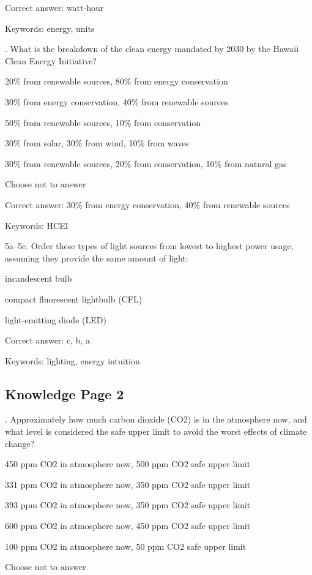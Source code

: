 Correct answer: watt-hour

Keywords: energy, units

\vspace{5 mm}
. What is the breakdown of the clean energy mandated by 2030 by the Hawaii Clean Energy Initiative?

\begin{answer}
	\item 20\% from renewable sources, 80\% from energy conservation
	\item 30\% from energy conservation, 40\% from renewable sources
	\item 50\% from renewable sources, 10\% from conservation
	\item 30\% from solar, 30\% from wind, 10\% from waves
	\item 30\% from renewable sources, 20\% from conservation, 10\% from natural gas
	\item Choose not to answer
\end{answer}

Correct answer: 30\% from energy conservation, 40\% from renewable sources

Keywords: HCEI

\vspace{5 mm}
\noindent
5a--5c. Order these types of light sources from lowest to highest power usage, assuming they provide the same amount of light:

\begin{answer}
	\item incandescent bulb
	\item compact fluorescent lightbulb (CFL)
	\item light-emitting diode (LED)
\end{answer}

Correct answer: c, b, a

Keywords: lighting, energy intuition


\subsection{Knowledge Page 2}

. Approximately how much carbon dioxide (CO2) is in the atmosphere now, and what level is considered the safe upper limit to avoid the worst effects of climate change?

\begin{answer}
	\item 450 ppm CO2 in atmosphere now, 500 ppm CO2 safe upper limit
	\item 331 ppm CO2 in atmosphere now, 350 ppm CO2 safe upper limit
	\item 393 ppm CO2 in atmosphere now, 350 ppm CO2 safe upper limit
	\item 600 ppm CO2 in atmosphere now, 450 ppm CO2 safe upper limit
	\item 100 ppm CO2 in atmosphere now, 50 ppm CO2 safe upper limit
	\item Choose not to answer
\end{answer}

